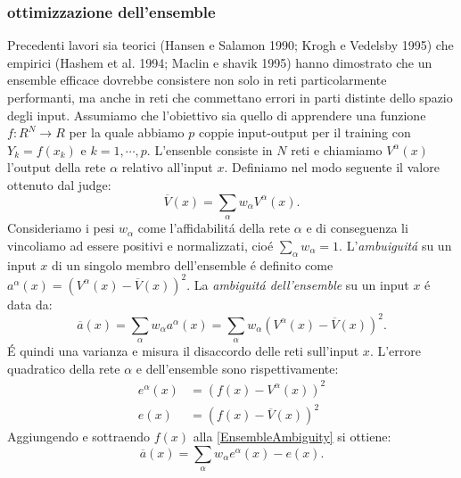 \documentclass[a4paper,10pt]{article}
\begin{document}
 \subsubsection{ottimizzazione dell'ensemble}
  Precedenti lavori sia teorici (Hansen e Salamon 1990; Krogh e Vedelsby 1995) che empirici (Hashem et al. 1994; Maclin e shavik 1995) hanno dimostrato che un ensemble efficace dovrebbe consistere non solo in reti particolarmente performanti, ma anche in reti che commettano errori in parti distinte dello spazio degli input. 
  Assumiamo che l'obiettivo sia quello di apprendere una funzione $f:R^N\to R$ per la quale abbiamo $p$ coppie input-output per il training con $Y_k = f \left( x_k \right) $ e $k=1, \cdots , p$. L'ensenble consiste in $N$ reti e chiamiamo $V^{\alpha}\left( x\right)$ l'output della rete $\alpha$ relativo all'input $x$. Definiamo nel modo seguente il valore ottenuto dal judge: 
  \begin{equation}
   \overline{V}\left(x\right) = \sum_{\alpha} w_{\alpha} V^{\alpha}\left(x\right).
  \end{equation}
  Consideriamo i pesi $w_{\alpha}$ come l'affidabilit\'a della rete $\alpha$ e di conseguenza li vincoliamo ad essere positivi e normalizzati, cio\'e $\sum_{\alpha} w_{\alpha} = 1$. L'\textit{ambuiguit\'a} su un input $x$ di un singolo membro dell'ensemble \'e definito come $a^{\alpha}\left(x\right)=\left(V^{\alpha}\left(x\right)-\overline{V}\left(x\right)\right)^2$. La \textit{ambiguit\'a dell'ensemble} su un input $x$ \'e data da:
  \begin{equation}
   \overline{a}\left(x\right) = \sum_{\alpha} w_{\alpha} a^{\alpha}\left(x\right) = \sum_{\alpha} w_{\alpha}\left(V^{\alpha}\left(x\right)-\overline{V}\left(x\right)\right)^2. \label{EnsembleAmbiguity}
  \end{equation}
  \'E quindi una varianza e misura il disaccordo delle reti sull'input $x$. L'errore quadratico della rete $\alpha$ e dell'ensemble  sono rispettivamente:
  \begin{align}
   e^{\alpha}\left(x\right) &= \left(f\left(x\right)-V^{\alpha}\left(x\right)\right)^2 \\
   e\left(x\right) &= \left(f\left(x\right)-\overline{V}\left(x\right)\right)^2 \label{ensembleQE}
  \end{align}
  Aggiungendo e sottraendo $f\left(x\right)$ alla \ref{EnsembleAmbiguity} si ottiene:
  \begin{equation}
   \overline{a}\left(x\right) = \sum_{\alpha} w_{\alpha} e^{\alpha}\left(x\right) - e\left(x\right).
  \end{equation}
\end{document}
